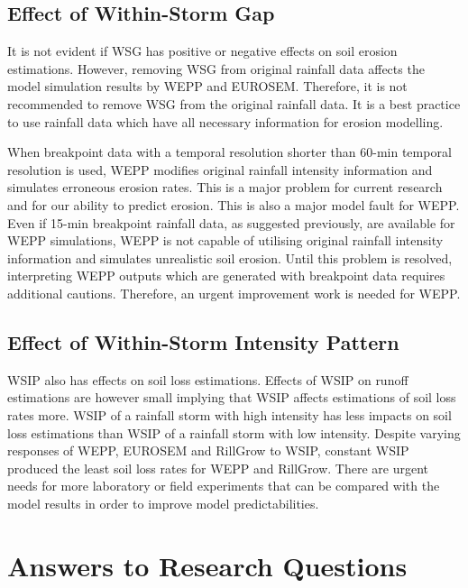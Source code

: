 \subsection{Effect of Within-Storm Gap}
It is not evident if WSG has positive or negative effects on soil erosion
estimations. However, removing WSG from original rainfall data affects the
model simulation results by WEPP and EUROSEM. Therefore, it is not recommended
to remove WSG from the original rainfall data. It is a best practice to
use rainfall data which have all necessary information for erosion modelling.

When breakpoint data with a temporal resolution shorter than 60-min temporal
resolution is used, WEPP modifies original rainfall intensity information and
simulates erroneous erosion rates. This is a major problem for current
research and for our ability to predict erosion. This is also a major model
fault for WEPP. Even if 15-min breakpoint rainfall data, as suggested
previously, are available for WEPP simulations, WEPP is not capable of
utilising original rainfall intensity information and simulates unrealistic soil
erosion. Until this problem is resolved, interpreting WEPP outputs which are
generated with breakpoint data requires additional cautions. Therefore, an
urgent improvement work is needed for WEPP.

\subsection{Effect of Within-Storm Intensity Pattern}
WSIP also has effects on soil loss estimations. Effects of WSIP on runoff
estimations are however small implying that WSIP affects estimations of soil
loss rates more. WSIP of a rainfall storm with high intensity has less impacts
on soil loss estimations than WSIP of a rainfall storm with low intensity.
Despite varying responses of WEPP, EUROSEM and RillGrow to WSIP, constant WSIP
produced the least soil loss rates for WEPP and RillGrow. There are urgent needs
for more laboratory or field experiments that can be compared with the model
results in order to improve model predictabilities.

\section{Answers to Research Questions}
\label{sec:ResearchQuestionsLinkedtoTheResults}


